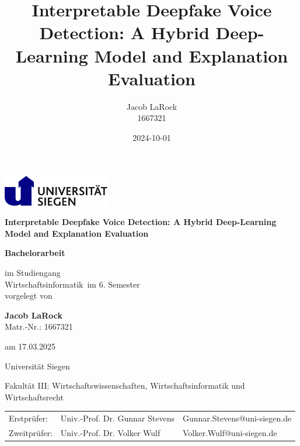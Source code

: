 \documentclass{article}
\title{Interpretable Deepfake Voice Detection: A Hybrid Deep-Learning Model and Explanation Evaluation}
\date{2024-10-01}
\author{Jacob LaRock\\1667321}
\makeatletter
\def\Institute{Universität Siegen}
\def\KindOfWork{Bachelorarbeit}
\def\Studiengang{Wirtschaftsinformatik}
\def\Fakultaet{Fakultät III: Wirtschaftswissenschaften, Wirtschaftsinformatik und Wirtschaftsrecht}
\def\Title{Interpretable Deepfake Voice Detection: A Hybrid Deep-Learning Model and Explanation Evaluation}
\def\Subtitle{}
\def\student{Jacob LaRock}
\def\studentno{1667321}
\def\Date{17.03.2025}
\def\semester{6}
\def\erstpruefer{Univ.-Prof. Dr. Gunnar Stevens}
\def\erstprueferMail{Gunnar.Stevens@uni-siegen.de}
\def\zweitpruefer{Univ.-Prof. Dr. Volker Wulf}
\def\zweitprueferMail{Volker.Wulf@uni-siegen.de}
\makeatother
\begin{document}
	\begin{titlepage}
        \begin{minipage}{0.9\linewidth}
			\centering
			\includegraphics [width=0.35\textwidth]{images/LogoSiegen}
        \end{minipage}

		\vspace{2cm}

		\centering

		{\Large\bfseries \Title\par}
		{\large\bfseries \Subtitle\par}
		\vspace{1.5cm}

		{\large \textbf{\KindOfWork}\par}

		\vspace{1cm}

		{\normalsize im Studiengang \\
			\Studiengang \ im \semester. Semester \\
		}
		\vspace{0.5cm}
		{\normalsize vorgelegt von}
		\vspace{0.5cm}

		{\normalsize \textbf{\student} \\
			Matr.-Nr.: \studentno  \\}
		{am \normalsize \Date\par}

		\vspace{0.5cm}

		{\Institute} \par
		{\Fakultaet}\par

		\vspace{0.5cm}

    {\begin{table}[ht]
			\centering\small
			\begin{tabular}{lll}
				{Erstprüfer:} & \erstpruefer & \erstprueferMail \\
				{Zweitprüfer:} & \zweitpruefer & \zweitprueferMail \\
			\end{tabular}
		\end{table}}     
		\vfill
	\end{titlepage}
    \newpage
\end{document}
